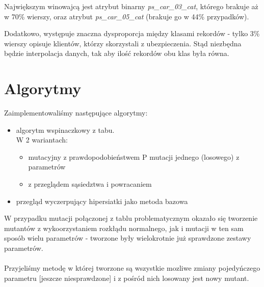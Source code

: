 \documentclass[11pt]{article}
\begin{document}
Największym winowajcą jest atrybut binarny \textsl{ps\_car\_03\_cat}, którego brakuje aż w 70\% wierszy, oraz atrybut \textsl{ps\_car\_05\_cat} (brakuje go w 44\% przypadków).

Dodatkowo, występuje znaczna dysproporcja między klasami rekordów - tylko 3\% wierszy opisuje klientów, którzy skorzystali z ubezpieczenia. Stąd niezbędna będzie interpolacja danych, tak aby ilość rekordów obu klas była równa.

\section{Algorytmy}
Zaimplementowaliśmy następujące algorytmy:
\begin{itemize}
	\item algorytm wspinaczkowy z tabu. \\ 
	W 2 wariantach:
		\begin{itemize}
			\item mutacyjny z prawdopodobieństwem P mutacji jednego (losowego) z parametrów
			\item z przeglądem sąsiedztwa i powracaniem
		\end{itemize}
	\item przegląd wyczerpujący hipersiatki jako metoda bazowa\\
\end{itemize}

W przypadku mutacji połączonej z  tablu problematycznym okazało się tworzenie mutantów z wykoorzystaniem rozkłądu normalnego, jak i mutacji w ten sam sposób wielu parametrów - tworzone były wielokrotnie już sprawdzone zestawy parametrów.\\\\
Przyjeliśmy metodę w której tworzone są wszystkie mozliwe zmiany pojedyńczego parametru [jeszcze niesprawdzone] i z pośród nich losowany jest nowy mutant.
\end{document}
